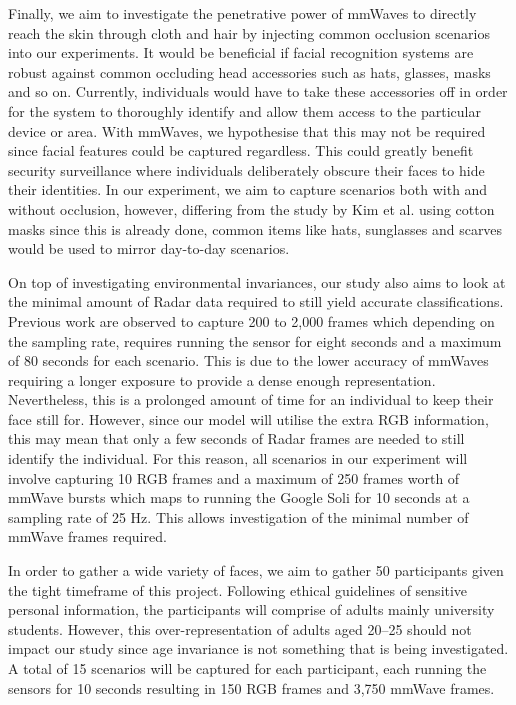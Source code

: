 \documentclass{interim}
\begin{document}
Finally, we aim to investigate the penetrative power of mmWaves to directly reach the skin through cloth and hair by injecting common occlusion scenarios into our experiments. It would be beneficial if facial recognition systems are robust against common occluding head accessories such as hats, glasses, masks and so on. Currently, individuals would have to take these accessories off in order for the system to thoroughly identify and allow them access to the particular device or area. With mmWaves, we hypothesise that this may not be required since facial features could be captured regardless. This could greatly benefit security surveillance where individuals deliberately obscure their faces to hide their identities. In our experiment, we aim to capture scenarios both with and without occlusion, however, differing from the study by Kim et al. \cite{kim2020face} using cotton masks since this is already done, common items like hats, sunglasses and scarves would be used to mirror day-to-day scenarios.

On top of investigating environmental invariances, our study also aims to look at the minimal amount of Radar data required to still yield accurate classifications. Previous work are observed to capture 200 to 2,000 frames which depending on the sampling rate, requires running the sensor for eight seconds and a maximum of 80 seconds for each scenario. This is due to the lower accuracy of mmWaves requiring a longer exposure to provide a dense enough representation. Nevertheless, this is a prolonged amount of time for an individual to keep their face still for. However, since our model will utilise the extra RGB information, this may mean that only a few seconds of Radar frames are needed to still identify the individual. For this reason, all scenarios in our experiment will involve capturing 10 RGB frames and a maximum of 250 frames worth of mmWave bursts which maps to running the Google Soli for 10 seconds at a sampling rate of 25 Hz. This allows investigation of the minimal number of mmWave frames required.

In order to gather a wide variety of faces, we aim to gather 50 participants given the tight timeframe of this project. Following ethical guidelines of sensitive personal information, the participants will comprise of adults mainly university students. However, this over-representation of adults aged 20--25 should not impact our study since age invariance is not something that is being investigated. A total of 15 scenarios will be captured for each participant, each running the sensors for 10 seconds resulting in 150 RGB frames and 3,750 mmWave frames.
\end{document}
